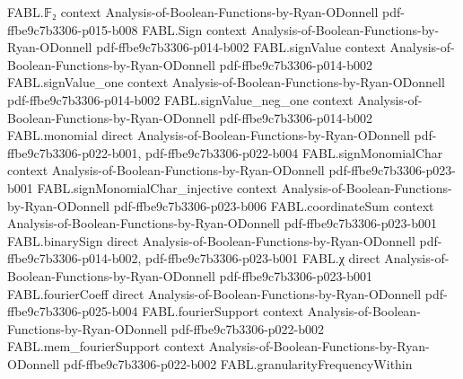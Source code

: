 \begin{theorem}
\label{FABL.expect_sq_fourierCoeff_randomRestriction}
\leanok
{}
\proofstep
  {FABL.𝔽₂}
  {context}
  {Analysis-of-Boolean-Functions-by-Ryan-ODonnell}
  {pdf-ffbe9c7b3306-p015-b008}
\proofstep
  {FABL.Sign}
  {context}
  {Analysis-of-Boolean-Functions-by-Ryan-ODonnell}
  {pdf-ffbe9c7b3306-p014-b002}
\proofstep
  {FABL.signValue}
  {context}
  {Analysis-of-Boolean-Functions-by-Ryan-ODonnell}
  {pdf-ffbe9c7b3306-p014-b002}
\proofstep
  {FABL.signValue_one}
  {context}
  {Analysis-of-Boolean-Functions-by-Ryan-ODonnell}
  {pdf-ffbe9c7b3306-p014-b002}
\proofstep
  {FABL.signValue_neg_one}
  {context}
  {Analysis-of-Boolean-Functions-by-Ryan-ODonnell}
  {pdf-ffbe9c7b3306-p014-b002}
\proofstep
  {FABL.monomial}
  {direct}
  {Analysis-of-Boolean-Functions-by-Ryan-ODonnell}
  {pdf-ffbe9c7b3306-p022-b001,
    pdf-ffbe9c7b3306-p022-b004}
\proofstep
  {FABL.signMonomialChar}
  {context}
  {Analysis-of-Boolean-Functions-by-Ryan-ODonnell}
  {pdf-ffbe9c7b3306-p023-b001}
\proofstep
  {FABL.signMonomialChar_injective}
  {context}
  {Analysis-of-Boolean-Functions-by-Ryan-ODonnell}
  {pdf-ffbe9c7b3306-p023-b006}
\proofstep
  {FABL.coordinateSum}
  {context}
  {Analysis-of-Boolean-Functions-by-Ryan-ODonnell}
  {pdf-ffbe9c7b3306-p023-b001}
\proofstep
  {FABL.binarySign}
  {direct}
  {Analysis-of-Boolean-Functions-by-Ryan-ODonnell}
  {pdf-ffbe9c7b3306-p014-b002,
    pdf-ffbe9c7b3306-p023-b001}
\proofstep
  {FABL.χ}
  {direct}
  {Analysis-of-Boolean-Functions-by-Ryan-ODonnell}
  {pdf-ffbe9c7b3306-p023-b001}
\proofstep
  {FABL.fourierCoeff}
  {direct}
  {Analysis-of-Boolean-Functions-by-Ryan-ODonnell}
  {pdf-ffbe9c7b3306-p025-b004}
\proofstep
  {FABL.fourierSupport}
  {context}
  {Analysis-of-Boolean-Functions-by-Ryan-ODonnell}
  {pdf-ffbe9c7b3306-p022-b002}
\proofstep
  {FABL.mem_fourierSupport}
  {context}
  {Analysis-of-Boolean-Functions-by-Ryan-ODonnell}
  {pdf-ffbe9c7b3306-p022-b002}
\proofstep
  {FABL.granularityFrequencyWithin}

\end{theorem}
